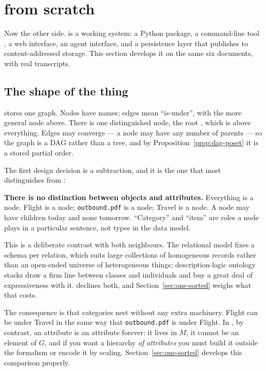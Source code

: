 \section{\odag{} from scratch}
\label{sec:ontodag}

Now the other side. \odag{} \citep{ontodag} is a working system: a Python
package, a command-line tool , a web interface, an agent interface,
and a persistence layer that publishes to content-addressed storage. This
section develops it on the same six documents, with real transcripts.

\subsection{The shape of the thing}

\odag{} stores one graph. Nodes have names; edges mean ``is-under'', with the
more general node above. There is one distinguished node, the root
\cmd{*}, which is above everything. Edges may converge --- a node may have any
number of parents --- so the graph is a DAG rather than a tree, and by
Proposition~\ref{prop:dag-poset} it is a stored partial order.

The first design decision is a subtraction, and it is the one that most
distinguishes \odag{} from \fca{}:

\begin{keyidea}
\textbf{There is no distinction between objects and attributes.} Everything is
a node. \textsf{Flight} is a node; \texttt{outbound.pdf} is a node;
\textsf{Travel} is a node. A node may have children today and none tomorrow.
``Category'' and ``item'' are roles a node plays in a particular sentence, not
types in the data model.
\end{keyidea}

This is a deliberate contrast with both neighbours. The relational model
\citep{codd1970} fixes a schema per relation, which suits large collections of
homogeneous records rather than an open-ended universe of heterogeneous
things; description-logic ontology stacks \citep{gruber1993,owl2} draw a
firm line between classes and individuals and buy a great deal of
expressiveness with it. \odag{} declines both, and
Section~\ref{sec:one-sorted} weighs what that costs.

The consequence is that categories nest without any extra machinery.
\textsf{Flight} can be under \textsf{Travel} in the same way that
\texttt{outbound.pdf} is under \textsf{Flight}. In \fca{}, by contrast, an
attribute is an attribute forever: it lives in $M$, it cannot be an element of
$G$, and if you want a hierarchy \emph{of attributes} you must build it
outside the formalism or encode it by scaling. Section~\ref{sec:one-sorted}
develops this comparison properly.

